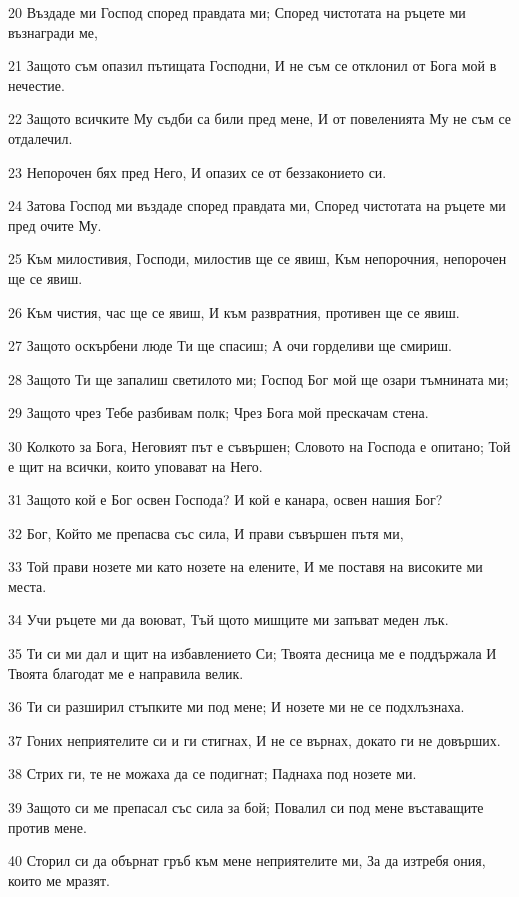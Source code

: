 \par 20 Въздаде ми Господ според правдата ми; Според чистотата на ръцете ми възнагради ме,
\par 21 Защото съм опазил пътищата Господни, И не съм се отклонил от Бога мой в нечестие.
\par 22 Защото всичките Му съдби са били пред мене, И от повеленията Му не съм се отдалечил.
\par 23 Непорочен бях пред Него, И опазих се от беззаконието си.
\par 24 Затова Господ ми въздаде според правдата ми, Според чистотата на ръцете ми пред очите Му.
\par 25 Към милостивия, Господи, милостив ще се явиш, Към непорочния, непорочен ще се явиш.
\par 26 Към чистия, час ще се явиш, И към развратния, противен ще се явиш.
\par 27 Защото оскърбени люде Ти ще спасиш; А очи горделиви ще смириш.
\par 28 Защото Ти ще запалиш светилото ми; Господ Бог мой ще озари тъмнината ми;
\par 29 Защото чрез Тебе разбивам полк; Чрез Бога мой прескачам стена.
\par 30 Колкото за Бога, Неговият път е съвършен; Словото на Господа е опитано; Той е щит на всички, които уповават на Него.
\par 31 Защото кой е Бог освен Господа? И кой е канара, освен нашия Бог?
\par 32 Бог, Който ме препасва със сила, И прави съвършен пътя ми,
\par 33 Той прави нозете ми като нозете на елените, И ме поставя на високите ми места.
\par 34 Учи ръцете ми да воюват, Тъй щото мишците ми запъват меден лък.
\par 35 Ти си ми дал и щит на избавлението Си; Твоята десница ме е поддържала И Твоята благодат ме е направила велик.
\par 36 Ти си разширил стъпките ми под мене; И нозете ми не се подхлъзнаха.
\par 37 Гоних неприятелите си и ги стигнах, И не се върнах, докато ги не довърших.
\par 38 Стрих ги, те не можаха да се подигнат; Паднаха под нозете ми.
\par 39 Защото си ме препасал със сила за бой; Повалил си под мене въставащите против мене.
\par 40 Сторил си да обърнат гръб към мене неприятелите ми, За да изтребя ония, които ме мразят.
